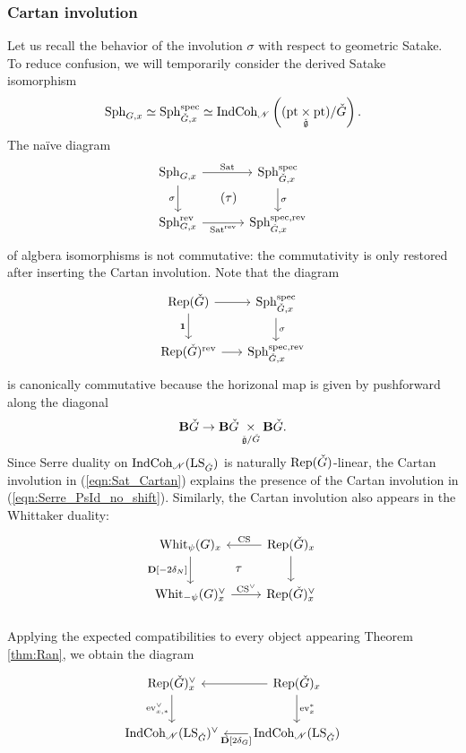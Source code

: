 \subsubsection{Cartan involution} Let us recall the behavior of the involution $\sigma$ with respect to geometric Satake. To reduce confusion, we will temporarily consider the derived Satake isomorphism
    \[
    \mathrm{Sph}_{G,x} \simeq
    \mathrm{Sph}_{{\check{G}},x}^{\mathrm{spec}} \simeq \mathrm{IndCoh}_{\mathscr{N}}\left( ( \mathrm{pt} \underset{{\check{\mathfrak{g}}}}{\times} \mathrm{pt} ) /{\check{G}} \right).
    \]
The na\"ive diagram
\[
\begin{tikzcd}[
  column sep={8em,between origins},
  row sep={4em,between origins}
]
    \Sph_{G,x} \arrow[r, "\Sat"] \arrow[d, "\sigma" left] \arrow[dr, phantom, "(\tau)"] & \Sph_{\LG,x}^\spec \arrow[d, "\sigma"] \\
    \Sph_{G,x}^\rev \arrow[r, "\Sat^\rev" below] & \Sph_{\LG,x}^{\spec, \rev}
\end{tikzcd}
\]
of algbera isomorphisms is not commutative: the commutativity is only restored after inserting the Cartan involution. Note that the diagram
\begin{equation}
\label{eqn:Sat_Cartan}
\begin{tikzcd}[
  column sep={7em,between origins},
  row sep={4em,between origins}
]
    \Rep(\LG) \arrow[r] \arrow[d, "\id" left] & \Sph_{\LG,x}^\spec \arrow[d, "\sigma"] \\
    \Rep(\LG)^\rev \arrow[r,] & \Sph_{\LG,x}^{\spec, \rev}
\end{tikzcd}
\end{equation}
is canonically commutative because the horizonal map is given by pushforward along the diagonal
    \[\mathbf{B} {\check{G}} \to \mathbf{B}{\check{G}} \underset{{\check{\mathfrak{g}}}/{\check{G}}}{\times} \mathbf{B}{\check{G}}.\]
Since Serre duality on $\mathrm{IndCoh}_{\mathscr{N}}(\mathrm{LS}_{\check{G}})$ is naturally $\mathrm{Rep}({\check{G}})$-linear, the Cartan involution in (\ref{eqn:Sat_Cartan}) explains the presence of the Cartan involution in (\ref{eqn:Serre_PsId_no_shift}). Similarly, the Cartan involution also appears in the Whittaker duality:
\[
\begin{tikzcd}[
  column sep={8em,between origins},
  row sep={4em,between origins}
]
  \Whit_\psi(G)_x \arrow[d, "\DD{[-2\delta_N]}" left] \arrow[dr, phantom, "\tau"] & \Rep(\LG)_x \arrow[d] \arrow[l, "\CS" above]\\
  \Whit_{-\psi}(G)_x^\vee \arrow[r, "\CS^\vee"] & \Rep(\LG)_x^\vee
\end{tikzcd}
\]

\subsubsection{} Applying the expected compatibilities to every object appearing Theorem \ref{thm:Ran}, we obtain the diagram
\[
\begin{tikzcd}[
  column sep={10em,between origins},
  row sep={4em,between origins}
]
      \Rep(\LG)_x^\vee \arrow[d, "\ev_{x,*}^\vee" left] & \Rep(\LG)_x \arrow[l] \arrow[d, "\ev_x^*"] \\
      \ICoh_\Nilp(\LS_\LG)^\vee & \ICoh_\Nilp(\LS_\LG) \arrow[l, "\DD{[2\delta_G]}"]
\end{tikzcd}
\]


